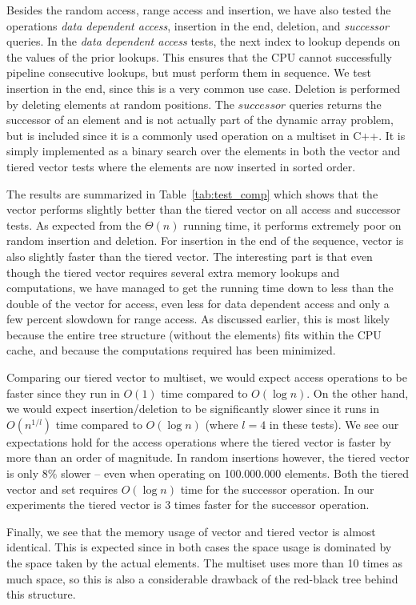 Besides the random access, range access and insertion,
we have also tested the operations \textit{data dependent access},
insertion in the end, deletion, and \textit{successor} queries. In the
\textit{data dependent access} tests, the next index to lookup depends on the values of the prior
lookups. This ensures that the CPU cannot successfully pipeline
consecutive lookups, but must perform them in sequence. We test insertion in the end, since
this is a very common use case. Deletion is performed by deleting elements at
random positions. The $successor$ queries returns the successor of an element
and is not actually part of the
dynamic array problem, but is included since it is a commonly used operation on
a multiset in C++. It is simply implemented as a binary search over the elements in
both the vector and tiered vector tests where the elements are now inserted in sorted order. 

The results are summarized in Table~\ref{tab:test_comp} which shows that the vector performs slightly better than the tiered vector on all access and successor tests. As expected from the $\Theta(n)$ running time, it performs extremely poor on random insertion and deletion. For insertion in the end of the sequence, vector is also slightly faster than the tiered vector. The interesting part is that even though the tiered vector requires several extra memory lookups and computations, we have managed to get the running time down to less than the double of the vector for access, even less for data dependent access and only a few percent slowdown for range access. As discussed earlier,
this is most likely because the entire tree structure (without the elements)
fits within the CPU cache, and because the computations required has been minimized.

Comparing our tiered vector to multiset, we would expect access operations to be
faster since they run in $O(1)$ time compared to $O(\log n)$. On the other
hand, we would expect insertion/deletion to be significantly slower since it
runs in $O(n^{1/l})$ time compared to $O(\log n)$ (where $l = 4$ in these tests). We
see our expectations hold for the access operations where the tiered vector is faster by more than an order of magnitude.
In random insertions however,  the tiered vector is only $8\%$ slower -- even when operating on 100.000.000 elements. Both the tiered
vector and set requires $O(\log n)$ time for the successor operation. In our
experiments the tiered vector is 3 times faster for the successor operation.

Finally, we see that the memory usage of vector and tiered vector is almost identical.
This is expected since in both cases the space usage is dominated by the space taken by the actual elements.
The multiset uses more than 10 times as much space, so this is also a considerable drawback of the red-black tree behind this structure. 

